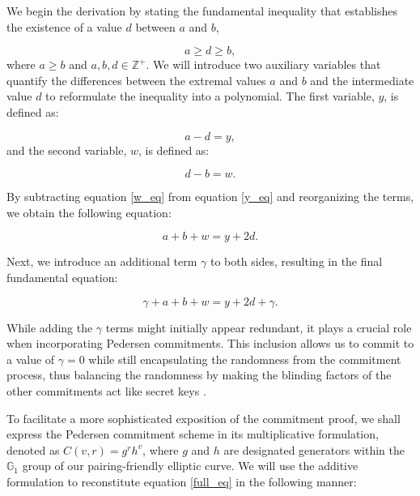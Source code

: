 \documentclass[version=preprint]{iacrcc}
\begin{document}
We begin the derivation by stating the fundamental inequality that establishes the existence of a value $d$ between $a$ and $b$,

\begin{equation}
a \geq d \geq b,
\end{equation}
where \( a \geq b \) and \( a, b, d \in \mathbb{Z}^+ \). We will introduce two auxiliary variables that quantify the differences between the extremal values \(a\) and \(b\) and the intermediate value \(d\) to reformulate the inequality into a polynomial. The first variable, \( y \), is defined as:

\begin{equation}
\label{y_eq}
a - d = y,
\end{equation}
and the second variable, \( w \), is defined as:

\begin{equation}
\label{w_eq}
d - b = w.
\end{equation}

By subtracting equation \ref{w_eq} from equation \ref{y_eq} and reorganizing the terms, we obtain the following equation:

\begin{equation}
\label{half_eq}
a + b + w = y + 2d.
\end{equation}

Next, we introduce an additional term \( \gamma \) to both sides, resulting in the final fundamental equation:

\begin{equation}
\label{full_eq}
\gamma + a + b + w = y + 2d + \gamma.
\end{equation}

While adding the \( \gamma \) terms might initially appear redundant, it plays a crucial role when incorporating Pedersen commitments. This inclusion allows us to commit to a value of \( \gamma = 0 \) while still encapsulating the randomness from the commitment process, thus balancing the randomness by making the blinding factors of the other commitments act like secret keys \cite{mw16}.

To facilitate a more sophisticated exposition of the commitment proof, we shall express the Pedersen commitment scheme in its multiplicative formulation, denoted as \( C(v, r) = g^{r} h^{v} \), where \( g \) and \( h \) are designated generators within the \( \mathbb{G}_{1} \) group of our pairing-friendly elliptic curve. We will use the additive formulation to reconstitute equation \ref{full_eq} in the following manner:
\end{document}
